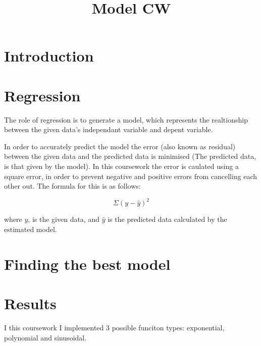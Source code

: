 \documentclass[]{article}
\title{Model CW }
\begin{document}
\maketitle

\section{Introduction}

\section{Regression}
The role of regression is to generate a model, which represents the realtionship between the given data's independant variable and depent variable. 

In order to accurately predict the model the error (also known as residual) between the given data and the predicted data is minimised (The predicted data, is that given by the model). In this coursework the error is caulated using a square error, in order to prevent negative and positive errors from cancelling each other out. The formula for this is as follows: 

\begin{equation}
  \Sigma (y - \hat{y})^2
\end {equation}

where \(y\), is the given data, and \(\hat{y}\) is the predicted data calculated by the estimated model.

\section{Finding the best model}

\section{Results}

I this coursework I implemented 3 possible funciton types: exponential, polynomial and sinusoidal. 
\end{document}
